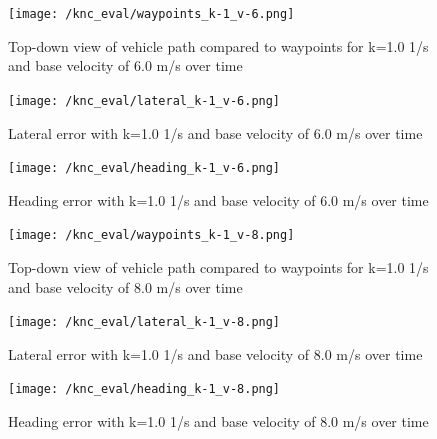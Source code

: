 \documentclass[titlepage, draft]{article}
\begin{document}
{\begin{figure}[H]
	\centering
	\begin{minipage}{.45\textwidth}
		\centering
		\texttt{[image: /knc\_eval/waypoints\_k-1\_v-6.png]}
		\caption{Top-down view of vehicle path compared to waypoints for k=1.0 1/s and base velocity of 6.0 m/s over time}
		\label{fig:wayk10v6}
	\end{minipage}%
	\hspace{0.1\textwidth}%
	\begin{minipage}{.45\textwidth}
		\centering
		\texttt{[image: /knc\_eval/lateral\_k-1\_v-6.png]}
		\caption{Lateral error with k=1.0 1/s and base velocity of 6.0 m/s over time}
		\label{fig:latk10v6}
	\end{minipage}
\end{figure}

\begin{figure}[H]
	\centering
	\begin{minipage}{.45\textwidth}
		\centering
		\texttt{[image: /knc\_eval/heading\_k-1\_v-6.png]}
		\caption{Heading error with k=1.0 1/s and base velocity of 6.0 m/s over time}
		\label{fig:headk10v6}
	\end{minipage}%
	\hspace{0.1\textwidth}%
	\begin{minipage}{.45\textwidth}
		\centering
		\texttt{[image: /knc\_eval/waypoints\_k-1\_v-8.png]}
		\caption{Top-down view of vehicle path compared to waypoints for k=1.0 1/s and base velocity of 8.0 m/s over time}
		\label{fig:wayk10v8}
	\end{minipage}
\end{figure}

\begin{figure}[H]
	\centering
	\begin{minipage}{.45\textwidth}
		\centering
		\texttt{[image: /knc\_eval/lateral\_k-1\_v-8.png]}
		\caption{Lateral error with k=1.0 1/s and base velocity of 8.0 m/s over time}
		\label{fig:latk10v8}
	\end{minipage}%
	\hspace{0.1\textwidth}%
	\begin{minipage}{.45\textwidth}
		\centering
		\texttt{[image: /knc\_eval/heading\_k-1\_v-8.png]}
		\caption{Heading error with k=1.0 1/s and base velocity of 8.0 m/s over time}
		\label{fig:headk10v8}
	\end{minipage}
\end{figure}

}
\end{document}

